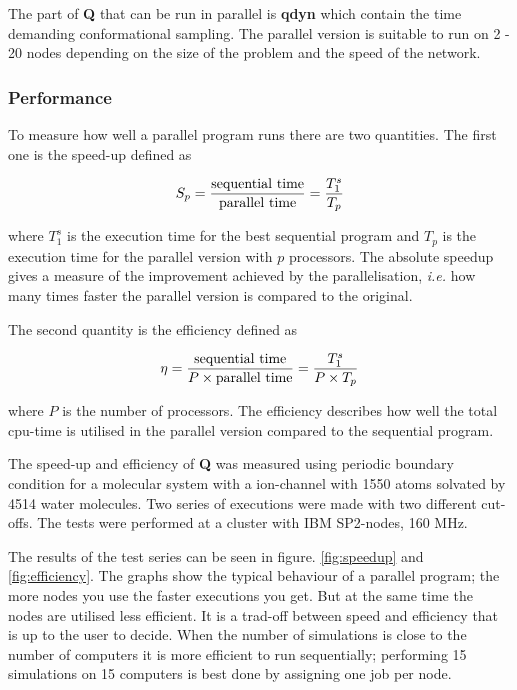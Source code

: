 \documentclass[a4paper,10pt]{article}
\begin{document}
The part of \textbf{Q} that can be run in parallel is \textbf{qdyn} which contain
the time demanding conformational sampling. The parallel version
is suitable to run on 2 - 20 nodes depending on the size of the
problem and the speed of the network.

\subsubsection{Performance} To measure how well a parallel program
runs there are two quantities. The first one is the speed-up
defined as

\begin {equation}
S_p = \frac{\rm sequential\ time}{\rm parallel\ time} =
\frac{T^s_1}{T_p} \label{eq:speedup}
\end{equation}

where $T^s_1$ is the execution time for the best sequential
program and $T_p$ is the execution time for the parallel version
with $p$ processors. The absolute speedup gives a measure of the
improvement achieved by the parallelisation, \emph{i.e.} how many
times faster the parallel version is compared to the original.

The second quantity is the efficiency defined as

\begin {equation}
\eta = \frac{\rm sequential\ time}{P \times \rm parallel\ time} =
\frac{T_1^s}{P \times T_p} \label{eq:efficiency}
\end{equation}

where $P$ is the number of processors. The efficiency describes
how well the total cpu-time is utilised in the parallel version
compared to the sequential program.

The speed-up and efficiency of  \textbf{Q} was measured using periodic boundary
condition for  a molecular system  with a ion-channel with  1550 atoms
solvated by 4514  water molecules. Two series of  executions were made
with two  different cut-offs.  The tests were  performed at  a cluster
with IBM SP2-nodes, 160 MHz.

The   results  of   the   test   series  can   be   seen  in   figure.
\ref{fig:speedup}  and  \ref{fig:efficiency}.   The  graphs  show  the
typical behaviour  of a parallel program;  the more nodes you  use the
faster executions you get. But at the same time the nodes are utilised
less efficient. It is a trad-off  between speed and efficiency that is
up to the user  to decide. When the number of  simulations is close to
the  number of  computers it  is more  efficient to  run sequentially;
performing 15  simulations on 15  computers is best done  by assigning
one job per node.
\end{document}
